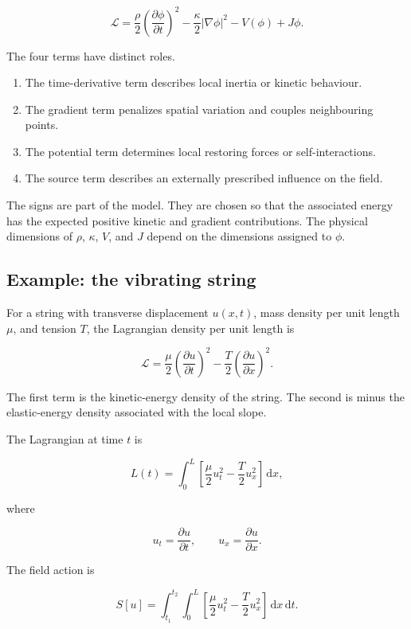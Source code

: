 \[
\boxed{
\mathcal{L}
=
\frac{\rho}{2}
\left(\frac{\partial\phi}{\partial t}\right)^{2}
-
\frac{\kappa}{2}
|\nabla\phi|^{2}
-
V(\phi)
+
J\phi
}.
\]

The four terms have distinct roles.

\begin{enumerate}
    \item The time-derivative term describes local inertia or kinetic behaviour.
    \item The gradient term penalizes spatial variation and couples neighbouring points.
    \item The potential term determines local restoring forces or self-interactions.
    \item The source term describes an externally prescribed influence on the field.
\end{enumerate}

The signs are part of the model. They are chosen so that the associated energy has the expected positive kinetic and gradient contributions. The physical dimensions of \(\rho\), \(\kappa\), \(V\), and \(J\) depend on the dimensions assigned to \(\phi\).

\subsection{Example: the vibrating string}

For a string with transverse displacement \(u(x,t)\), mass density per unit length \(\mu\), and tension \(T\), the Lagrangian density per unit length is

\[
\boxed{
\mathcal{L}
=
\frac{\mu}{2}
\left(\frac{\partial u}{\partial t}\right)^{2}
-
\frac{T}{2}
\left(\frac{\partial u}{\partial x}\right)^{2}
}.
\]

The first term is the kinetic-energy density of the string. The second is minus the elastic-energy density associated with the local slope.

The Lagrangian at time \(t\) is

\[
L(t)
=
\int_{0}^{L}
\left[
\frac{\mu}{2}u_{t}^{2}
-
\frac{T}{2}u_{x}^{2}
\right]
\,\mathrm{d}x,
\]

where

\[
u_{t}=\frac{\partial u}{\partial t},
\qquad
u_{x}=\frac{\partial u}{\partial x}.
\]

The field action is

\[
S[u]
=
\int_{t_{1}}^{t_{2}}
\int_{0}^{L}
\left[
\frac{\mu}{2}u_{t}^{2}
-
\frac{T}{2}u_{x}^{2}
\right]
\,\mathrm{d}x\,\mathrm{d}t.
\]

